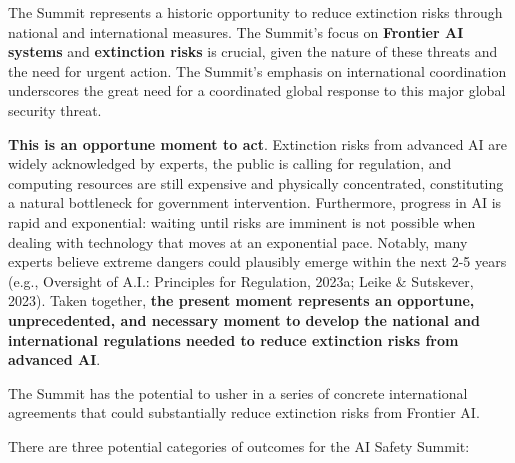 \documentclass[12pt,a4paper]{article}
\begin{document}
The Summit represents a historic opportunity to reduce extinction risks through national and international measures. The Summit’s focus on \textbf{Frontier AI systems} and \textbf{extinction risks} is crucial, given the nature of these threats and the need for urgent action. The Summit’s emphasis on international coordination underscores the great need for a coordinated global response to this major global security threat.

\textbf{This is an opportune moment to act}. Extinction risks from advanced AI are widely acknowledged by experts, the public is calling for regulation, and computing resources are still expensive and physically concentrated, constituting a natural bottleneck for government intervention. Furthermore, progress in AI is rapid and exponential: waiting until risks are imminent is not possible when dealing with technology that moves at an exponential pace. Notably, many experts believe extreme dangers could plausibly emerge within the next 2-5 years (e.g., Oversight of A.I.: Principles for Regulation, 2023a; Leike \& Sutskever, 2023). Taken together, \textbf{the present moment represents an opportune, unprecedented, and necessary moment to develop the national and international regulations needed to reduce extinction risks from advanced AI}. 

The Summit has the potential to usher in a series of concrete international agreements that could substantially reduce extinction risks from Frontier AI. 

There are three potential categories of outcomes for the AI Safety Summit:
\end{document}
